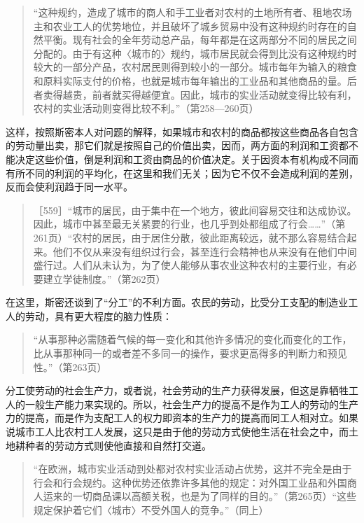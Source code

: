 \begin{quote}{“这种规约，造成了城市的商人和手工业者对农村的土地所有者、租地农场主和农业工人的优势地位，并且破坏了城乡贸易中没有这种规约时存在的自然平衡。现有社会的全年劳动总产品，每年都是在这两部分不同的居民之间分配的。由于有这种〈城市的〉规约，城市居民就会得到比没有这种规约时较大的一部分产品，农村居民则得到较小的一部分。城市每年为输入的粮食和原料实际支付的价格，也就是城市每年输出的工业品和其他商品的量。后者卖得越贵，前者就买得越便宜。因此，城市的实业活动就变得比较有利，农村的实业活动则变得比较不利。”（第258—260页）}\end{quote}

这样，按照斯密本人对问题的解释，如果城市和农村的商品都按这些商品各自包含的劳动量出卖，那它们就是按照自己的价值出卖，因而，两方面的利润和工资都不能决定这些价值，倒是利润和工资由商品的价值决定。关于因资本有机构成不同而有所不同的利润的平均化，在这里和我们无关；因为它不仅不会造成利润的差别，反而会使利润趋于同一水平。

\begin{quote}{［559］“城市的居民，由于集中在一个地方，彼此间容易交往和达成协议。因此，城市中甚至最无关紧要的行业，也几乎到处都组成了行会……”（第261页）“农村的居民，由于居住分散，彼此距离较远，就不那么容易结合起来。他们不仅从来没有组织过行会，甚至连行会精神也从来没有在他们中间盛行过。人们从未认为，为了使人能够从事农业这种农村的主要行业，有必要建立学徒制度。”（第262页）}\end{quote}

在这里，斯密还谈到了“分工”的不利方面。农民的劳动，比受分工支配的制造业工人的劳动，具有更大程度的脑力性质：

\begin{quote}{“从事那种必需随着气候的每一变化和其他许多情况的变化而变化的工作，比从事那种同一的或者差不多同一的操作，要求更高得多的判断力和预见性。”（第263页）}\end{quote}

分工使劳动的社会生产力，或者说，社会劳动的生产力获得发展，但这是靠牺牲工人的一般生产能力来实现的。所以，社会生产力的提高不是作为工人的劳动的生产力的提高，而是作为支配工人的权力即资本的生产力的提高而同工人相对立。如果说城市工人比农村工人发展，这只是由于他的劳动方式使他生活在社会之中，而土地耕种者的劳动方式则使他直接和自然打交道。

\begin{quote}{“在欧洲，城市实业活动到处都对农村实业活动占优势，这并不完全是由于行会和行会规约。这种优势还依靠许多其他的规定：对外国工业品和外国商人运来的一切商品课以高额关税，也是为了同样的目的。”（第265页）“这些规定保护着它们〈城市〉不受外国人的竞争。”（同上）}\end{quote}

